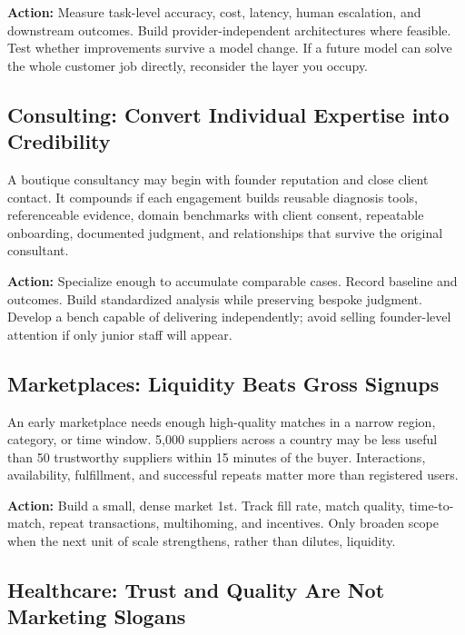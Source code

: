 \vspace{0.5em}
\noindent\textbf{Action:} Measure task-level accuracy, cost, latency, human escalation, and downstream outcomes. Build provider-independent architectures where feasible. Test whether improvements survive a model change. If a future model can solve the whole customer job directly, reconsider the layer you occupy.

\subsection{Consulting: Convert Individual Expertise into Credibility}
\label{sec:consulting_individual_to_organizational}

A boutique consultancy may begin with founder reputation and close client contact. It compounds if each engagement builds reusable diagnosis tools, referenceable evidence, domain benchmarks with client consent, repeatable onboarding, documented judgment, and relationships that survive the original consultant.

\vspace{0.5em}
\noindent\textbf{Action:} Specialize enough to accumulate comparable cases. Record baseline and outcomes. Build standardized analysis while preserving bespoke judgment. Develop a bench capable of delivering independently; avoid selling founder-level attention if only junior staff will appear.

\subsection{Marketplaces: Liquidity Beats Gross Signups}
\label{sec:marketplaces_liquidity_beats_signups}

An early marketplace needs enough high-quality matches in a narrow region, category, or time window. 5,000 suppliers across a country may be less useful than 50 trustworthy suppliers within 15 minutes of the buyer. Interactions, availability, fulfillment, and successful repeats matter more than registered users.

\vspace{0.5em}
\noindent\textbf{Action:} Build a small, dense market 1st. Track fill rate, match quality, time-to-match, repeat transactions, multihoming, and incentives. Only broaden scope when the next unit of scale strengthens, rather than dilutes, liquidity.

\subsection{Healthcare: Trust and Quality Are Not Marketing Slogans}
\label{sec:healthcare_trust_clinical_quality}

